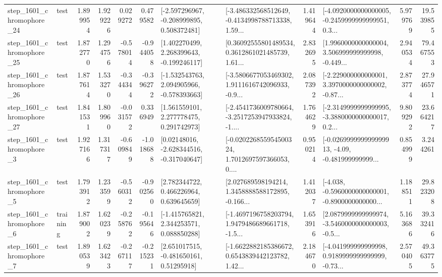 \begin{tabular}{llrrrrllrlrr}
 step\_1601\_chromophore\_24 &      test &      1.899954 &    1.929226 &      0.029272 &  0.479582 &   [-2.597296967, -0.208999895, 0.508372481] &  [-3.486332568512649, -0.4134998788713338, 1.59... &       1.419644 &  [-4.0920000000000005, -0.2459999999999951, 0.3... &            5.979769 &         19.539855 \\
 step\_1601\_chromophore\_25 &      test &      1.872770 &    1.294756 &     -0.578014 & -0.944058 &    [1.402270499, 2.268399643, -0.199246117] &  [0.36092555801489534, 0.3612861021485739, 1.61... &       2.832695 &  [1.9960000000000004, 3.506999999999998, -0.449... &            2.940534 &         79.467553 \\
 step\_1601\_chromophore\_26 &      test &      1.877614 &    1.533270 &     -0.344344 & -0.396272 &   [-1.532543763, 2.094905966, -0.578393663] &  [-3.5806677053469302, 1.9111616742096933, -0.9... &       2.087392 &  [-2.229000000000001, 3.3970000000000002, -0.87... &            2.873774 &         27.946571 \\
 step\_1601\_chromophore\_27 &      test &      1.841531 &    1.809960 &     -0.031572 &  0.336949 &     [1.561559101, 2.277778475, 0.291742973] &  [-2.4541736009780664, -3.2517253947933824, -1.... &       1.764629 &  [-2.3149999999999995, -3.3880000000000017, 0.2... &            9.809292 &         23.664217 \\
  step\_1601\_chromophore\_3 &      test &      1.927166 &    1.317317 &     -0.609849 & -1.018688 &    [0.02148016, -2.628344516, -0.317040647] &  [-0.020226855954500324, 1.7012697597366053, 0.... &       0.950214 &  [-0.026999999999999913, -4.09, -0.481999999999... &            0.854999 &          3.244261 \\
  step\_1601\_chromophore\_5 &      test &      1.793912 &    1.233599 &     -0.560312 & -0.902560 &     [2.782344722, 0.466226964, 0.639645659] &  [2.027689598194214, 1.3458888588172895, -0.166... &       1.412037 &  [-4.038, -0.5960000000000001, -0.8900000000000... &            1.188511 &         29.823208 \\
  step\_1601\_chromophore\_6 &  training &      1.879002 &    1.620239 &     -0.258762 & -0.195646 &    [-1.415765821, 2.344253571, 0.088850288] &  [-1.4697196758203794, 1.9479486689661718, -1.5... &       1.653916 &  [2.0879999999999974, -3.5460000000000003, -0.5... &            5.163686 &         39.332416 \\
  step\_1601\_chromophore\_7 &      test &      1.890539 &    1.623423 &     -0.267117 & -0.215231 &     [2.651017515, -0.481650161, 0.51295918] &  [-1.6622882185386672, 0.6543839442123782, 1.42... &       2.184670 &  [-4.041999999999998, 0.9189999999999999, -0.73... &            2.570405 &         49.363775 \\

\end{tabular}
